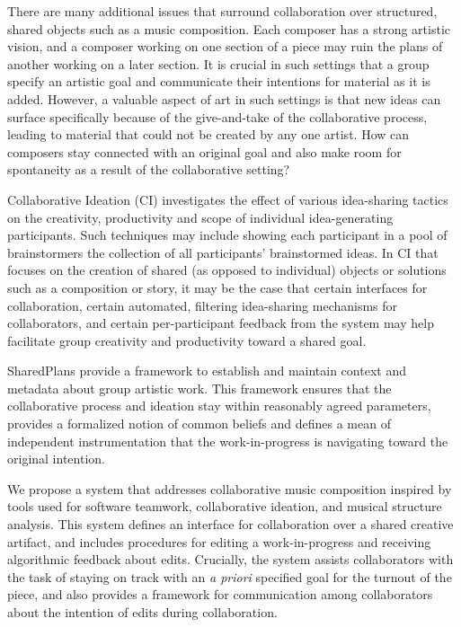 \documentclass[final,authoryear,5p,times,twocolumn]{elsarticle}
\begin{document}
There are many additional issues that surround collaboration over structured, shared objects such as a music composition. Each composer has a strong artistic vision, and a composer working on one section of a piece may ruin the plans of another working on a later section. It is crucial in such settings that a group specify an artistic goal and communicate their intentions for material as it is added. However, a valuable aspect of art in such settings is that new ideas can surface specifically because of the give-and-take of the collaborative process, leading to material that could not be created by any one artist. How can composers stay connected with an original goal and also make room for spontaneity as a result of the collaborative setting?

Collaborative Ideation (CI) investigates the effect of various idea-sharing tactics on the creativity, productivity and scope of individual idea-generating participants. Such techniques may include showing each participant in a pool of brainstormers the collection of all participants' brainstormed ideas. In CI that focuses on the creation of shared (as opposed to individual) objects or solutions such as a composition or story, it may be the case that certain interfaces for collaboration, certain automated, filtering idea-sharing mechanisms for collaborators, and certain per-participant feedback from the system may help facilitate group creativity and productivity toward a shared goal.

SharedPlans provide a framework to establish and maintain context and metadata about group artistic work. This framework ensures that the collaborative process and ideation stay within reasonably agreed parameters, provides a formalized notion of common beliefs and defines a mean of independent instrumentation that the work-in-progress is navigating toward the original intention.

We propose a system that addresses collaborative music composition inspired by tools used for software teamwork, collaborative ideation, and musical structure analysis. This system defines an interface for collaboration over a shared creative artifact, and includes procedures for editing a work-in-progress and receiving algorithmic  feedback about edits. Crucially, the system assists collaborators with the task of staying on track with an \textit{a priori} specified goal for the turnout of the piece, and also provides a framework for communication among collaborators about the intention of edits during collaboration.
\end{document}
